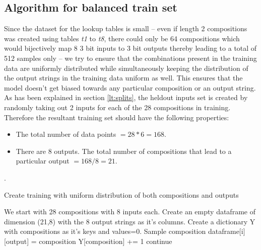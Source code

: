 \begin{appendix}
	
\chapter{Algorithm for balanced train set}\label{Chapter:results}

Since the dataset for the lookup tables is small -- even if length 2 compositions was created using tables \textit{t1} to \textit{t8}, there could only be 64 compositions which would bijectively map 8 3 bit inputs to 3 bit outputs thereby leading to a total of 512 samples only -- we try to ensure that the combinations present in the training data are uniformly distributed while simultaneously keeping the distribution of the output strings in the training data uniform as well. This ensures that the model doesn't get biased towards any particular composition or an output string. As has been explained in section \ref{lt:splits}, the heldout inputs set is created by randomly taking out 2 inputs for each of the 28 compositions in training. Therefore the resultant training set should have the following properties:
\begin{itemize}
	\item The total number of data points  $= 28*6 = 168$.
	\item There are 8 outputs. The total number of compositions that lead to a particular output $=168/8 = 21$.
\end{itemize}

.
\begin{algorithm}
	\caption{Create training with uniform distribution of both compositions and outputs}
	\begin{algorithmic}
		\STATE We start with 28 compositions with 8 inputs each.
		\STATE Create an empty dataframe of dimension (21,8) with the 8 output strings as it's columns.
		\STATE Create a dictionary Y with compositions as it's keys and values=0.
		\FOR {i in range [0, 21)}
		\STATE Sample composition
		\STATE dataframe[i][output] = composition
		\STATE Y[composition] += 1
		\ELSE
		\STATE continue
		\ENDIF
		\ENDFOR
		\ENDFOR		
	\end{algorithmic}
\end{algorithm}

\end{appendix}